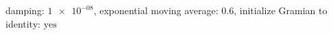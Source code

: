 damping: $\num[scientific-notation=true]{1e-08}$, exponential moving average: $\num[scientific-notation=true]{0.6}$, initialize Gramian to identity: $\text{yes}$